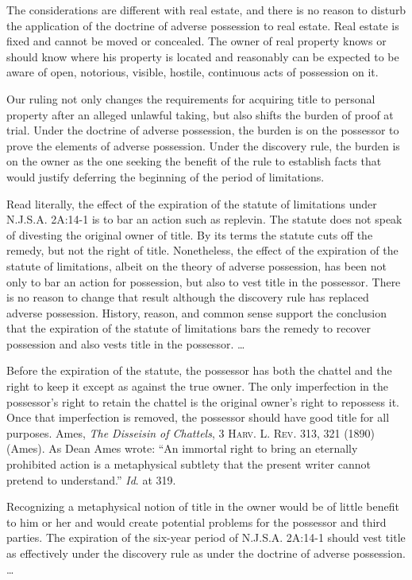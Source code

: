 The considerations are different with real estate, and there is no reason to
disturb the application of the doctrine of adverse possession to real estate.
Real estate is fixed and cannot be moved or concealed. The owner of real
property knows or should know where his property is located and reasonably can
be expected to be aware of open, notorious, visible, hostile, continuous acts
of possession on it.

Our ruling not only changes the requirements for acquiring title to personal
property after an alleged unlawful taking, but also shifts the burden of proof
at trial. Under the doctrine of adverse possession, the burden is on the
possessor to prove the elements of adverse possession. Under the discovery
rule, the burden is on the owner as the one seeking the benefit of the rule to
establish facts that would justify deferring the beginning of the period of
limitations.


Read literally, the effect of the expiration of the statute of limitations under
N.J.S.A. 2A:14-1 is to bar an action such as replevin. The statute does not
speak of divesting the original owner of title. By its terms the statute cuts
off the remedy, but not the right of title. Nonetheless, the effect of the
expiration of the statute of limitations, albeit on the theory of adverse
possession, has been not only to bar an action for possession, but also to vest
title in the possessor. There is no reason to change that result although the
discovery rule has replaced adverse possession. History, reason, and common
sense support the conclusion that the expiration of the statute of limitations
bars the remedy to recover possession and also vests title in the possessor.
\ldots

Before the expiration of the statute, the possessor has both the chattel and the
right to keep it except as against the true owner. The only imperfection in the
possessor's right to retain the chattel is the original owner's right to
repossess it. Once that imperfection is removed, the possessor should have good
title for all purposes. Ames, \textit{The Disseisin of Chattels}, 3
\textsc{Harv. L. Rev}. 313, 321 (1890) (Ames). As Dean Ames wrote: ``An
immortal right to bring an eternally prohibited action is a metaphysical
subtlety that the present writer cannot pretend to understand.'' \textit{Id}.
at 319.

Recognizing a metaphysical notion of title in the owner would be of little
benefit to him or her and would create potential problems for the possessor and
third parties. The expiration of the six-year period of N.J.S.A. 2A:14-1 should
vest title as effectively under the discovery rule as under the doctrine of
adverse possession. \ldots


